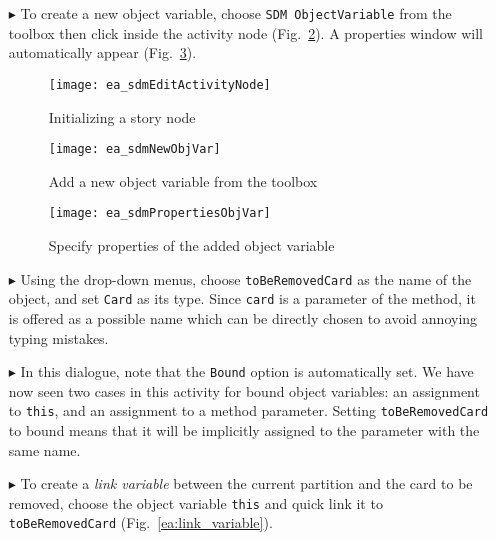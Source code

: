 \begin{itemize}
\item[$\blacktriangleright$] To create a new object variable, choose \texttt{SDM ObjectVariable} from the toolbox then click inside the activity node
(Fig.~\ref{ea:tool_box}). A properties window will automatically appear (Fig.~\ref{ea:object_variable_properties}).

\begin{figure}[htpb]
\begin{center} 
  \texttt{[image: ea\_sdmEditActivityNode]}
  \caption{Initializing a story node}  
  \label{ea:story_pattern}
\end{center}
\end{figure}

\begin{figure}[htp]
\begin{center}
  \texttt{[image: ea\_sdmNewObjVar]}
  \caption{Add a new object variable from the toolbox}  
  \label{ea:tool_box}
\end{center}
\end{figure}

\newpage

\vspace{0.5cm}

\begin{figure}[htp]
\begin{center}
  \texttt{[image: ea\_sdmPropertiesObjVar]}
  \caption{Specify properties of the added object variable}  
  \label{ea:object_variable_properties}
\end{center}
\end{figure}


\item[$\blacktriangleright$] Using the drop-down menus, choose \texttt{toBeRemovedCard} as the name of the object, and set \texttt{Card} as its type.
Since \texttt{card} is a parameter of the method, it is offered as a possible name which can be directly chosen to avoid annoying typing mistakes.

\item[$\blacktriangleright$] In this dialogue, note that the \texttt{Bound} option is automatically set. We have now seen two cases in this activity for bound
object variables: an assignment to \texttt{this}, and an assignment to a method parameter. Setting \texttt{toBeRemovedCard} to bound means that it will be implicitly
assigned to the parameter with the same name.

\item[$\blacktriangleright$] To create a \emph{link variable} between the current partition and the card to be removed, choose the object variable \texttt{this}
and quick link it to \texttt{toBeRemovedCard} (Fig.~\ref{ea:link_variable}).


\end{itemize}
